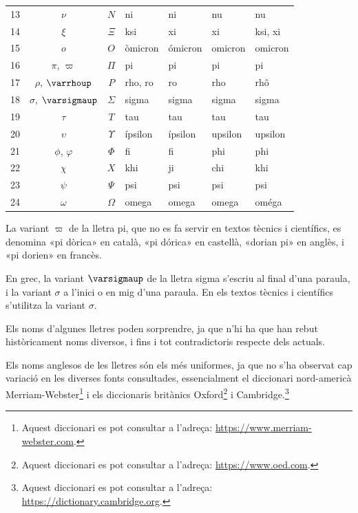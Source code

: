 \begin{center}
\begin{threeparttable}
\begin{tabular}{cccllll}
		13 & $\nu$ & $N$ & ni & ni &  nu & nu\\
		14 & $\xi$ & $\Xi$ & ksi & xi &  xi & ksi, xi\\
		15 & $o$ & $O$ & òmicron & ómicron &  omicron & omicron\\
		16 & $\pi$, $\varpi$\tnote{\color{blue}(a)} & $\Pi$ & pi & pi &  pi & pi\\
		17 & $\rho$, $\varrhoup$ & $P$ & rho, ro & ro &  rho & rhô\\
		18 & $\sigma$, $\varsigmaup$\tnote{\color{blue}(b)} & $\Sigma$ & sigma & sigma &  sigma &sigma\\
		19 & $\tau$ & $T$ & tau & tau & tau &tau\\
		20 & $\upsilon$ & $\Upsilon$ & ípsilon & ípsilon &  upsilon & upsilon\\
		21 & $\phi$, $\varphi$ & $\Phi$ & fi & fi &  phi & phi\\
		22 & $\chi$ & $X$ & khi & ji &  chi & khi\\
		23 & $\psi$ & $\Psi$ & psi & psi &  psi & psi\\
		24 & $\omega$ & $\Omega$ & omega & omega &  omega & oméga\\
		\bottomrule[1pt]
	\end{tabular}
	\begin{tablenotes}
		\item[\color{blue}(a)] {\footnotesize La variant $\varpi$ de la lletra pi, que no es fa servir en textos tècnics i científics, es denomina «pi dòrica» en  català, «pi dórica» en castellà, «dorian pi» en anglès, i «pi dorien» en francès.}
		\item[\color{blue}(b)] {\footnotesize En grec, la variant $\varsigmaup$ de la lletra sigma s'escriu  al final d'una paraula, i la variant $\sigma$  a l'inici o en mig d'una paraula. En els textos tècnics i científics s'utilitza  la variant $\sigma$.}
	\end{tablenotes}
\end{threeparttable}
\end{center}



Els noms d'algunes lletres poden sorprendre, ja que n'hi ha que han rebut històricament noms
diversos, i fins i tot contradictoris respecte dels actuals.

Els noms anglesos de les lletres són els més uniformes, ja que no
s'ha observat cap variació en les diverses fonts consultades, essencialment el diccionari nord-americà Merriam-Webster\footnote{Aquest diccionari es pot consultar a l'adreça: \href{https://www.merriam-webster.com/}{https:/\!\!/www.merriam-webster.com}.} i els diccionaris britànics Oxford\footnote{Aquest diccionari es pot consultar a l'adreça: \href{https://www.oed.com/}{https:/\!\!/www.oed.com}.} i Cambridge.\footnote{Aquest diccionari es pot consultar a l'adreça: \href{https://dictionary.cambridge.org/}{https:/\!\!/dictionary.cambridge.org}.}

